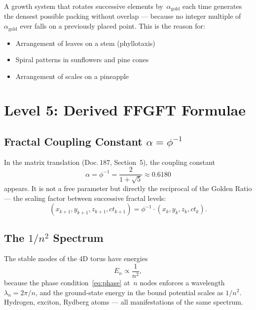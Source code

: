 A growth system that rotates successive elements by~$\alpha_{\text{gold}}$
each time generates the densest possible packing without overlap —
because no integer multiple of~$\alpha_{\text{gold}}$ ever falls on
a previously placed point. This is the reason for:
\begin{itemize}
  \item Arrangement of leaves on a stem (phyllotaxis)
  \item Spiral patterns in sunflowers and pine cones
  \item Arrangement of scales on a pineapple
\end{itemize}

\section{Level 5: Derived FFGFT Formulae}

\subsection{Fractal Coupling Constant $\alpha = \phi^{-1}$}

In the matrix translation (Doc.\,187, Section~5), the coupling constant
\begin{equation}
  \alpha = \phi^{-1} = \frac{2}{1+\sqrt{5}} \approx 0.6180
\end{equation}
appears. It is not a free parameter but directly the reciprocal of
the Golden Ratio — the scaling factor between successive fractal
levels:
\begin{equation}
  (x_{k+1}, y_{k+1}, z_{k+1}, ct_{k+1}) = \phi^{-1} \cdot
  (x_k, y_k, z_k, ct_k).
\end{equation}

\subsection{The $1/n^2$ Spectrum}

The stable modes of the 4D torus have energies
\begin{equation}
  E_n \propto \frac{1}{n^2},
\end{equation}
because the phase condition~\eqref{eq:phase} at~$n$ nodes enforces a
wavelength $\lambda_n = 2\pi/n$, and the ground-state energy in the
bound potential scales as $1/n^2$. Hydrogen, exciton, Rydberg atoms —
all manifestations of the same spectrum.

